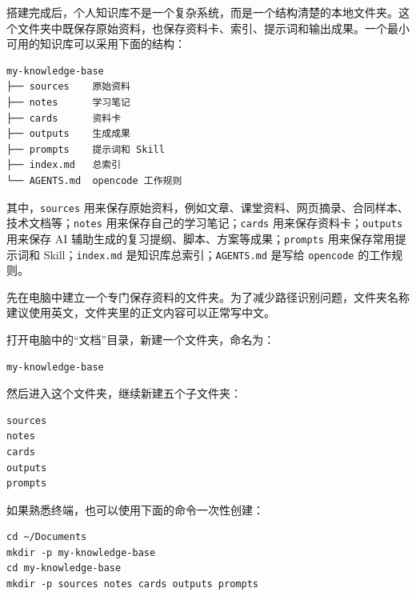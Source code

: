 
搭建完成后，个人知识库不是一个复杂系统，而是一个结构清楚的本地文件夹。这个文件夹中既保存原始资料，也保存资料卡、索引、提示词和输出成果。一个最小可用的知识库可以采用下面的结构：

\begin{tcolorbox}[filebox,title=个人知识库目录结构]
\begin{verbatim}
my-knowledge-base
├── sources    原始资料
├── notes      学习笔记
├── cards      资料卡
├── outputs    生成成果
├── prompts    提示词和 Skill
├── index.md   总索引
└── AGENTS.md  opencode 工作规则
\end{verbatim}
\end{tcolorbox}

其中，\texttt{sources} 用来保存原始资料，例如文章、课堂资料、网页摘录、合同样本、技术文档等；\texttt{notes} 用来保存自己的学习笔记；\texttt{cards} 用来保存资料卡；\texttt{outputs} 用来保存 AI 辅助生成的复习提纲、脚本、方案等成果；\texttt{prompts} 用来保存常用提示词和 Skill；\texttt{index.md} 是知识库总索引；\texttt{AGENTS.md} 是写给 \texttt{opencode} 的工作规则。











   

先在电脑中建立一个专门保存资料的文件夹。为了减少路径识别问题，文件夹名称建议使用英文，文件夹里的正文内容可以正常写中文。

\begin{tcolorbox}[stepbox,title=操作 1：手动创建文件夹]
打开电脑中的“文档”目录，新建一个文件夹，命名为：

\begin{verbatim}
my-knowledge-base
\end{verbatim}

然后进入这个文件夹，继续新建五个子文件夹：

\begin{verbatim}
sources
notes
cards
outputs
prompts
\end{verbatim}
\end{tcolorbox}

如果熟悉终端，也可以使用下面的命令一次性创建：

\begin{tcolorbox}[filebox,title=可选：终端命令]
\begin{verbatim}
cd ~/Documents
mkdir -p my-knowledge-base
cd my-knowledge-base
mkdir -p sources notes cards outputs prompts
\end{verbatim}
\end{tcolorbox}


